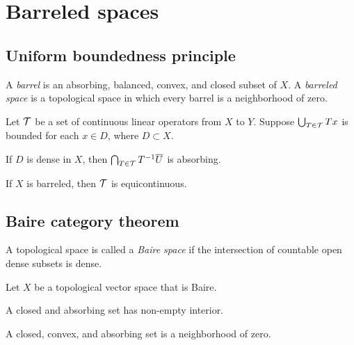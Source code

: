 \documentclass{../note}
\begin{document}
\chapter{Barreled spaces}

\section{Uniform boundedness principle}
\begin{prb}
A \emph{barrel} is an absorbing, balanced, convex, and closed subset of $X$.
A \emph{barreled space} is a topological space in which every barrel is a neighborhood of zero.
\end{prb}


\begin{prb}
Let $\mathcal{T}$ be a set of continuous linear operators from $X$ to $Y$.
Suppose $\bigcup_{T\in\mathcal{T}}Tx$ is bounded for each $x\in D$, where $D\subset X$.
\begin{parts}
\item If $D$ is dense in $X$, then $\bigcap_{T\in\mathcal{T}}T^{-1}\overline U$ is absorbing.
\item If $X$ is barreled, then $\mathcal{T}$ is equicontinuous.
\end{parts}
\end{prb}



\section{Baire category theorem}

\begin{prb}
A topological space is called a \emph{Baire space} if the intersection of countable open dense subsets is dense.
\end{prb}


\begin{prb}
Let $X$ be a topological vector space that is Baire.
\begin{parts}
\item A closed and absorbing set has non-empty interior.
\item A closed, convex, and absorbing set is a neighborhood of zero.
\end{parts}
\end{prb}
\end{document}
